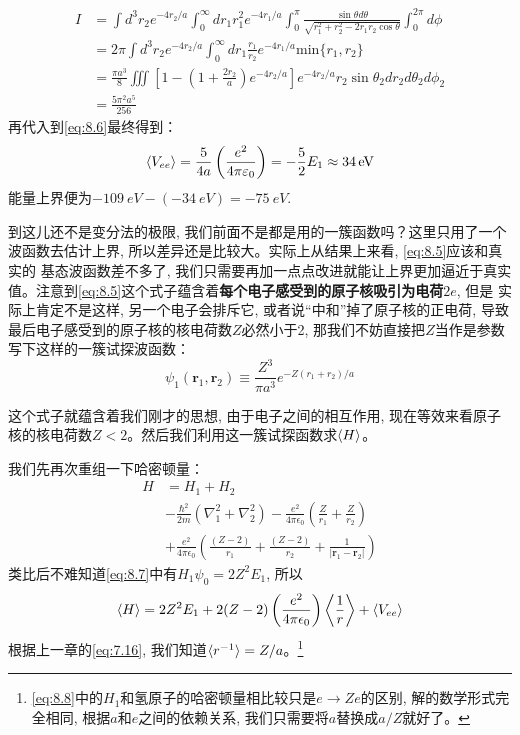 \documentclass[a4paper,zihao=-4,linespread=1]{ctexrep}
\begin{document}
    \begin{align*}
        I&=\int d^3r_2e^{-4r_2/a}\int^{\infty}_{0}dr_1 r_1^2e^{-4r_1/a}\int_0^\pi\frac{\sin\theta d\theta}{\sqrt{r_1^2+r_2^2-2r_1r_2\cos\theta}}\int_0^{2\pi}d\phi\\
        &=2\pi\int d^3r_2e^{-4r_2/a}\int^{\infty}_{0}dr_1 \frac{r_1}{r_2}e^{-4r_1/a}\mathrm{min}\{r_1,r_2\}\\
        &=\frac{\pi a^{3}}{8}\iiint\left[1-\left(1+\frac{2 r_{2}}{a}\right) e^{-4 r_{2} / a}\right] e^{-4 r_{2} / a} r_{2} \sin \theta_{2} d r_{2} d \theta_{2} d \phi_{2}\\
        &=\frac{5\pi^2a^5}{256}
    \end{align*} 
    再代入到\ref{eq:8.6}最终得到：
    \[\braket{V_{ee}}=\frac{5}{4a}\left(\frac{e^2}{4\pi\varepsilon_0}\right)=-\frac{5}{2}E_1\approx\SI[]{34}{eV}\]
    能量上界便为$\SI[]{-109}{eV}-(\SI[]{-34}{eV})=\SI[]{-75}{eV}$.

    到这儿还不是变分法的极限, 我们前面不是都是用的一簇函数吗？这里只用了一个波函数去估计上界, 所以差异还是比较大。实际上从结果上来看, \ref{eq:8.5}应该和真实的
    基态波函数差不多了, 我们只需要再加一点点改进就能让上界更加逼近于真实值。注意到\ref{eq:8.5}这个式子蕴含着\textbf{每个电子感受到的原子核吸引为电荷$2e$}, 但是
    实际上肯定不是这样, 另一个电子会排斥它, 或者说“中和”掉了原子核的正电荷, 导致最后电子感受到的原子核的核电荷数$Z$必然小于2, 那我们不妨直接把$Z$当作是参数写下这样的一簇试探波函数：
    \begin{equation}
        \label{eq:8.7}
        \psi_{1}\left(\mathbf{r}_{1}, \mathbf{r}_{2}\right) \equiv \frac{Z^{3}}{\pi a^{3}} e^{-Z\left(r_{1}+r_{2}\right) / a}
    \end{equation}
    
    这个式子就蕴含着我们刚才的思想, 由于电子之间的相互作用, 现在等效来看原子核的核电荷数$Z<2$。然后我们利用这一簇试探函数求$\braket{H}$。

    我们先再次重组一下哈密顿量：
    \begin{equation}
        \label{eq:8.8}
        \begin{aligned}
            H &=H_1+H_2\\
            & -\frac{\hbar^{2}}{2 m}\left(\nabla_{1}^{2}+\nabla_{2}^{2}\right)-\frac{e^{2}}{4 \pi \epsilon_{0}}\left(\frac{Z}{r_{1}}+\frac{Z}{r_{2}}\right) \\
            & +\frac{e^{2}}{4 \pi \epsilon_{0}}\left(\frac{(Z-2)}{r_{1}}+\frac{(Z-2)}{r_{2}}+\frac{1}{\left|\mathbf{r}_{1}-\mathbf{r}_{2}\right|}\right)
        \end{aligned}
    \end{equation}
    类比后不难知道\ref{eq:8.7}中有$H_1\psi_0=2Z^2E_1$, 所以
    \begin{equation}
        \label{eq:8.9}
        \langle H\rangle=2 Z^{2} E_{1}+2(Z-2)\left(\frac{e^{2}}{4 \pi \epsilon_{0}}\right)\Braket{\frac{1}{r}}+\left\langle V_{e e}\right\rangle
    \end{equation}
    根据上一章的\ref{eq:7.16}, 我们知道$\braket{r^{-1}}=Z/a$。\footnote{\ref{eq:8.8}中的$H_1$和氢原子的哈密顿量相比较只是$e\to Ze$的区别, 解的数学形式完全相同, 根据$a$和$e$之间的依赖关系, 我们只需要将$a$替换成$a/Z$就好了。}
    
\end{document}
